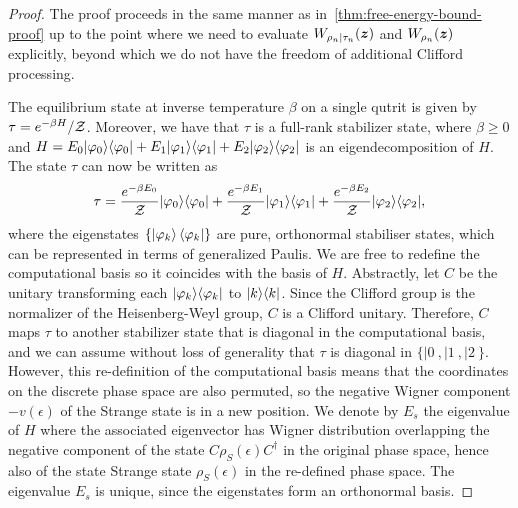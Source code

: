 \documentclass[pra,
aps,
twocolumn,
superscriptaddress,
groupedaddress,
nofootinbib,
reprint
]{revtex4-1}
\begin{document}
\begin{proof}
The proof proceeds in the same manner as in~\cref{thm:free-energy-bound-proof} up to the point where we need to evaluate $W_{\rho_n |\tau_n} (\bm{z})$ and $W_{\rho_n}(\bm{z})$ explicitly, beyond which we do not have the freedom of additional Clifford processing.

The equilibrium state at inverse temperature $\beta$ on a single qutrit is given by $\tau = e^{-\beta H} / \mathcal{Z}$. Moreover, we have that $\tau$ is a full-rank stabilizer state, where $\beta \geq 0$ and $H = E_0 |\varphi_0\rangle\langle\varphi_0| + E_1 |\varphi_1\rangle\langle\varphi_1| + E_2 |\varphi_2\rangle\langle\varphi_2|$ is an eigendecomposition of $H$.
The state $\tau$ can now be written as 
\begin{equation}
	\tau = \frac{e^{-\beta E_0}}{\mathcal{Z}} |\varphi_0\rangle\langle\varphi_0| + \frac{e^{-\beta E_1}}{\mathcal{Z}} |\varphi_1\rangle\langle\varphi_1| + \frac{e^{-\beta E_2}}{\mathcal{Z}} |\varphi_2\rangle\langle\varphi_2|,
\end{equation}
where the eigenstates $\{\ket{\varphi_k}\langle\varphi_k|\}$ are pure, orthonormal stabiliser states, which can be represented in terms of generalized Paulis. We are free to redefine the computational basis so it coincides with the basis of $H$. Abstractly, let $C$ be the unitary transforming each $|\varphi_k\rangle\langle\varphi_k|$ to $|k\rangle\langle k|$. Since the Clifford group is the normalizer of the Heisenberg-Weyl group, $C$ is a Clifford unitary. Therefore, $C$ maps $\tau$ to another stabilizer state that is diagonal in the computational basis, and we can assume without loss of generality that $\tau$ is diagonal in $\{|0\>,|1\>, |2\>\}$. However, this re-definition of the computational basis means that the coordinates on the discrete phase space are also permuted, so the negative Wigner component $-v(\epsilon)$ of the Strange state is in a new position. We denote by $E_s$ the eigenvalue of $H$ where the associated eigenvector has Wigner distribution overlapping the negative component of the state $C\rho_S(\epsilon)C^\dagger$ in the original phase space, hence also of the state Strange state $\rho_S(\epsilon)$ in the re-defined phase space. The eigenvalue $E_s$ is unique, since the eigenstates form an orthonormal basis.


\end{proof}
\end{document}
